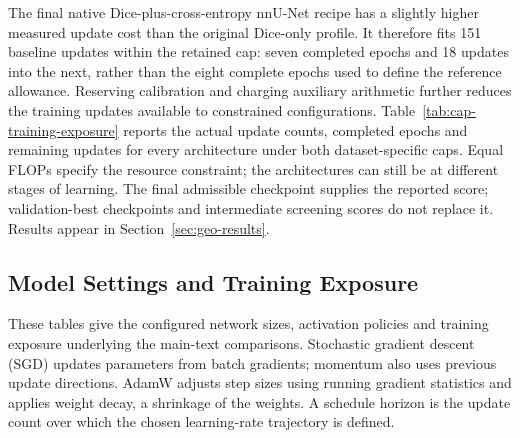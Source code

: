 \documentclass[12pt,a4paper]{article}
\begin{document}
The final native Dice-plus-cross-entropy nnU-Net recipe has a slightly
higher measured update cost than the original Dice-only profile. It
therefore fits 151 baseline updates within the retained cap: seven
completed epochs and 18 updates into the next, rather than the eight
complete epochs used to define the reference allowance. Reserving
calibration and charging auxiliary arithmetic further reduces the
training updates available to constrained configurations.
Table~\ref{tab:cap-training-exposure} reports the actual update counts,
completed epochs and remaining updates for every architecture under
both dataset-specific caps. Equal FLOPs specify the resource constraint;
the architectures can still be at different stages of learning.
The final admissible checkpoint supplies the reported score;
validation-best checkpoints and intermediate screening scores do not
replace it. Results appear in Section~\ref{sec:geo-results}.

\subsection{Model Settings and Training Exposure}\label{sec:implementation-tables}
These tables give the configured network sizes, activation policies and
training exposure underlying the main-text comparisons. Stochastic
gradient descent (SGD) updates parameters from batch gradients; momentum
also uses previous update directions. AdamW adjusts step sizes using
running gradient statistics and applies weight decay, a shrinkage of the
weights. A schedule horizon is the update count over which the chosen
learning-rate trajectory is defined.
\end{document}
